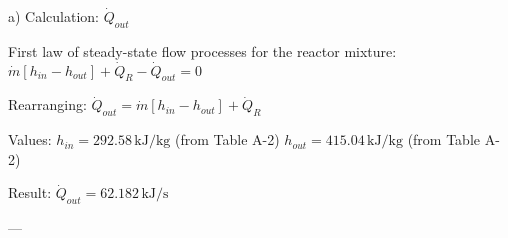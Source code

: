 a) Calculation: \( \dot{Q}_{out} \)  

First law of steady-state flow processes for the reactor mixture:  
\( \dot{m} \left[ h_{in} - h_{out} \right] + \dot{Q}_R - \dot{Q}_{out} = 0 \)  

Rearranging:  
\( \dot{Q}_{out} = \dot{m} \left[ h_{in} - h_{out} \right] + \dot{Q}_R \)  

Values:  
\( h_{in} = 292.58 \, \text{kJ/kg} \) (from Table A-2)  
\( h_{out} = 415.04 \, \text{kJ/kg} \) (from Table A-2)  

Result:  
\( \dot{Q}_{out} = 62.182 \, \text{kJ/s} \)  

---